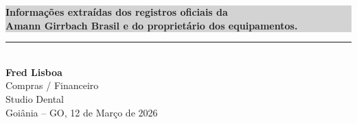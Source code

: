 \documentclass[12pt, a4paper]{article}
\begin{document}
\vspace{1.5cm}

\begin{center}
\colorbox{lightGray}{%
    \parbox{0.85\textwidth}{%
        \centering
        \vspace{0.4cm}
        \textcolor{primaryColor}{\textbf{Informações extraídas dos registros oficiais da}} \\
        \textcolor{primaryColor}{\textbf{Amann Girrbach Brasil e do proprietário dos equipamentos.}} \\
        \vspace{0.4cm}
    }%
}
\end{center}

\vfill

\begin{flushright}
    \rule{8cm}{0.5pt} \\
    \textbf{Fred Lisboa} \\
    Compras / Financeiro \\
    Studio Dental \\
    Goiânia -- GO, 12 de Março de 2026
\end{flushright}
\end{document}
